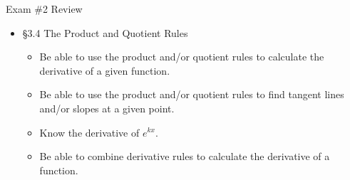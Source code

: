 \documentclass[cal1spr16Lectures.tex]{subfiles}
\begin{document}
\begin{frame}[allowframebreaks]{Exam \#2 Review}
\begin{itemize}
\begin{exe}
\end{exe}
%
\framebreak
\item \S 3.4 The Product and Quotient Rules
	\begin{itemize}\footnotesize
	\item Be able to use the product and/or quotient rules to calculate the derivative of a given function.
	\item Be able to use the product and/or quotient rules to find tangent lines and/or slopes at a given point.
	\item Know the derivative of $e^{kx}$.
	\item Be able to combine derivative rules to calculate the derivative of a function.
	\end{itemize}
	

\end{itemize}
\end{frame}
\end{document}
